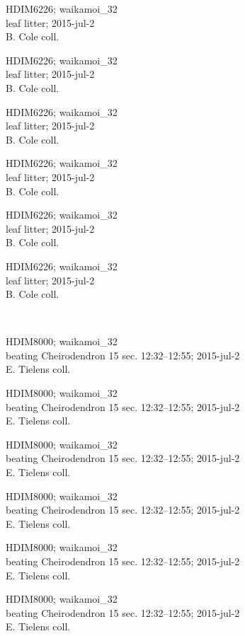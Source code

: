 \documentclass[2pt]{extarticle}
\begin{document}
\noindent
\parbox{0.16\textwidth}{\tiny \raggedright \rule[-0.3\baselineskip]{0pt}{10pt}HDIM6226; waikamoi\_32\\ leaf litter; 2015-jul-2\\ B. Cole coll.}
\parbox{0.16\textwidth}{\tiny \raggedright \rule[-0.3\baselineskip]{0pt}{10pt}HDIM6226; waikamoi\_32\\ leaf litter; 2015-jul-2\\ B. Cole coll.}
\parbox{0.16\textwidth}{\tiny \raggedright \rule[-0.3\baselineskip]{0pt}{10pt}HDIM6226; waikamoi\_32\\ leaf litter; 2015-jul-2\\ B. Cole coll.}
\parbox{0.16\textwidth}{\tiny \raggedright \rule[-0.3\baselineskip]{0pt}{10pt}HDIM6226; waikamoi\_32\\ leaf litter; 2015-jul-2\\ B. Cole coll.}
\parbox{0.16\textwidth}{\tiny \raggedright \rule[-0.3\baselineskip]{0pt}{10pt}HDIM6226; waikamoi\_32\\ leaf litter; 2015-jul-2\\ B. Cole coll.}
\parbox{0.16\textwidth}{\tiny \raggedright \rule[-0.3\baselineskip]{0pt}{10pt}HDIM6226; waikamoi\_32\\ leaf litter; 2015-jul-2\\ B. Cole coll.} \\ 
\vspace{0.001in} 

\noindent
\parbox{0.16\textwidth}{\tiny \raggedright \rule[-0.3\baselineskip]{0pt}{10pt}HDIM8000; waikamoi\_32\\ beating Cheirodendron 15 sec. 12:32--12:55; 2015-jul-2\\ E. Tielens coll.}
\parbox{0.16\textwidth}{\tiny \raggedright \rule[-0.3\baselineskip]{0pt}{10pt}HDIM8000; waikamoi\_32\\ beating Cheirodendron 15 sec. 12:32--12:55; 2015-jul-2\\ E. Tielens coll.}
\parbox{0.16\textwidth}{\tiny \raggedright \rule[-0.3\baselineskip]{0pt}{10pt}HDIM8000; waikamoi\_32\\ beating Cheirodendron 15 sec. 12:32--12:55; 2015-jul-2\\ E. Tielens coll.}
\parbox{0.16\textwidth}{\tiny \raggedright \rule[-0.3\baselineskip]{0pt}{10pt}HDIM8000; waikamoi\_32\\ beating Cheirodendron 15 sec. 12:32--12:55; 2015-jul-2\\ E. Tielens coll.}
\parbox{0.16\textwidth}{\tiny \raggedright \rule[-0.3\baselineskip]{0pt}{10pt}HDIM8000; waikamoi\_32\\ beating Cheirodendron 15 sec. 12:32--12:55; 2015-jul-2\\ E. Tielens coll.}
\parbox{0.16\textwidth}{\tiny \raggedright \rule[-0.3\baselineskip]{0pt}{10pt}HDIM8000; waikamoi\_32\\ beating Cheirodendron 15 sec. 12:32--12:55; 2015-jul-2\\ E. Tielens coll.} \\ 
\vspace{0.001in} 
\end{document}
